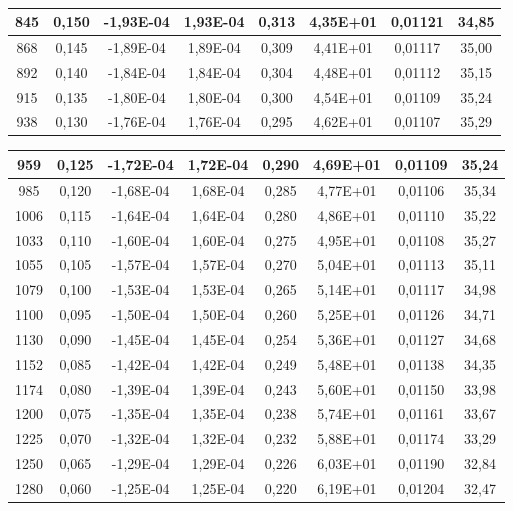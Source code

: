 \begin{table}[H]
\begin{tabular}{|c|c|c|c|c|c|c|c|}
		845 & 0,150 & -1,93E-04 & 1,93E-04 & 0,313 & 4,35E+01 & 0,01121 & 34,85 \\ \hline
		868 & 0,145 & -1,89E-04 & 1,89E-04 & 0,309 & 4,41E+01 & 0,01117 & 35,00 \\ \hline
		892 & 0,140 & -1,84E-04 & 1,84E-04 & 0,304 & 4,48E+01 & 0,01112 & 35,15 \\ \hline
		915 & 0,135 & -1,80E-04 & 1,80E-04 & 0,300 & 4,54E+01 & 0,01109 & 35,24 \\ \hline
		938 & 0,130 & -1,76E-04 & 1,76E-04 & 0,295 & 4,62E+01 & 0,01107 & 35,29 \\ \hline
						\end{tabular}
	\caption{}
\label{tabelakynch}
\end{table}

\begin{table}[H]
\centering
\begin{tabular}{|c|c|c|c|c|c|c|c|}
		959 & 0,125 & -1,72E-04 & 1,72E-04 & 0,290 & 4,69E+01 & 0,01109 & 35,24 \\ \hline
		985 & 0,120 & -1,68E-04 & 1,68E-04 & 0,285 & 4,77E+01 & 0,01106 & 35,34 \\ \hline
		1006 & 0,115 & -1,64E-04 & 1,64E-04 & 0,280 & 4,86E+01 & 0,01110 & 35,22 \\ \hline
		1033 & 0,110 & -1,60E-04 & 1,60E-04 & 0,275 & 4,95E+01 & 0,01108 & 35,27 \\ \hline
		1055 & 0,105 & -1,57E-04 & 1,57E-04 & 0,270 & 5,04E+01 & 0,01113 & 35,11 \\ \hline
		1079 & 0,100 & -1,53E-04 & 1,53E-04 & 0,265 & 5,14E+01 & 0,01117 & 34,98 \\ \hline
		1100 & 0,095 & -1,50E-04 & 1,50E-04 & 0,260 & 5,25E+01 & 0,01126 & 34,71 \\ \hline
		1130 & 0,090 & -1,45E-04 & 1,45E-04 & 0,254 & 5,36E+01 & 0,01127 & 34,68 \\ \hline
		1152 & 0,085 & -1,42E-04 & 1,42E-04 & 0,249 & 5,48E+01 & 0,01138 & 34,35 \\ \hline
		1174 & 0,080 & -1,39E-04 & 1,39E-04 & 0,243 & 5,60E+01 & 0,01150 & 33,98 \\ \hline
		1200 & 0,075 & -1,35E-04 & 1,35E-04 & 0,238 & 5,74E+01 & 0,01161 & 33,67 \\ \hline
		1225 & 0,070 & -1,32E-04 & 1,32E-04 & 0,232 & 5,88E+01 & 0,01174 & 33,29 \\ \hline
		1250 & 0,065 & -1,29E-04 & 1,29E-04 & 0,226 & 6,03E+01 & 0,01190 & 32,84 \\ \hline
		1280 & 0,060 & -1,25E-04 & 1,25E-04 & 0,220 & 6,19E+01 & 0,01204 & 32,47 \\ \hline

\end{tabular}
\end{table}

